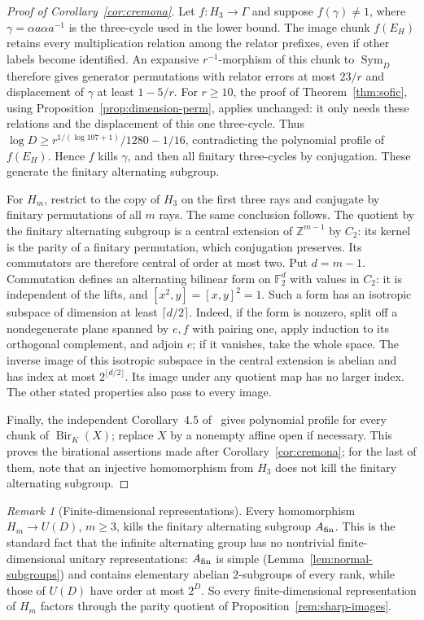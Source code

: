 \documentclass[11pt,a4paper]{article}
\theoremstyle{plain}
\theoremstyle{definition}
\theoremstyle{remark}
\newtheorem{remark}[theorem]{Remark}
\DeclareMathOperator{\Sym}{Sym}
\begin{document}
\begin{proof}[Proof of Corollary~\ref{cor:cremona}]
Let $f:H_3\to\Gamma$ and suppose $f(\gamma)\ne1$, where $\gamma=\alpha a\alpha a^{-1}$ is the three-cycle used in the lower bound.
The image chunk $f(E_H)$ retains every multiplication relation among the relator prefixes, even if other labels become identified.
An expansive $r^{-1}$-morphism of this chunk to $\Sym_D$ therefore gives generator permutations with relator errors at most $23/r$
and displacement of $\gamma$ at least $1-5/r$. For $r\ge10$, the proof of Theorem~\ref{thm:sofic}, using
Proposition~\ref{prop:dimension-perm}, applies unchanged: it only needs these relations and the displacement of this one three-cycle.
Thus $\log D\ge r^{1/(\log107+1)}/1280-1/16$, contradicting the polynomial profile of $f(E_H)$.
Hence $f$ kills $\gamma$, and then all finitary three-cycles by conjugation. These generate the finitary alternating subgroup.

For $H_m$, restrict to the copy of $H_3$ on the first three rays and conjugate by finitary permutations of all $m$ rays. The same
conclusion follows. The quotient by the finitary alternating subgroup is a central extension of $\mathbb Z^{m-1}$ by $C_2$:
its kernel is the parity of a finitary permutation, which conjugation preserves. Its commutators are therefore central of order at most
two. Put $d=m-1$. Commutation defines an alternating bilinear form on $\mathbb F_2^d$ with values in $C_2$: it is independent of
the lifts, and $[x^2,y]=[x,y]^2=1$. Such a form has an isotropic subspace of dimension at least $\lceil d/2\rceil$. Indeed, if the form
is nonzero, split off a nondegenerate plane spanned by $e,f$ with pairing one, apply induction to its orthogonal complement, and adjoin $e$;
if it vanishes, take the whole space. The inverse image of this isotropic subspace in the central extension is abelian and has index
at most $2^{\lfloor d/2\rfloor}$. Its image under any quotient map has no larger index. The other stated properties also pass to every image.

Finally, the independent Corollary~4.5 of~\cite{Cornulier2013} gives polynomial profile for every chunk of $\operatorname{Bir}_K(X)$;
replace $X$ by a nonempty affine open if necessary. This proves the birational assertions made after Corollary~\ref{cor:cremona}; for
the last of them, note that an injective homomorphism from $H_3$ does not kill the finitary alternating subgroup.
\end{proof}

\begin{remark}[Finite-dimensional representations]\label{rem:finite-representations}
Every homomorphism $H_m\to U(D)$, $m\ge3$, kills the finitary alternating subgroup $A_{\rm fin}$. This is the standard fact that the
infinite alternating group has no nontrivial finite-dimensional unitary representations: $A_{\rm fin}$ is simple (Lemma~\ref{lem:normal-subgroups})
and contains elementary abelian $2$-subgroups of every rank, while those of $U(D)$ have order at most $2^D$. So every finite-dimensional
representation of $H_m$ factors through the parity quotient of Proposition~\ref{rem:sharp-images}.
\end{remark}
\end{document}
